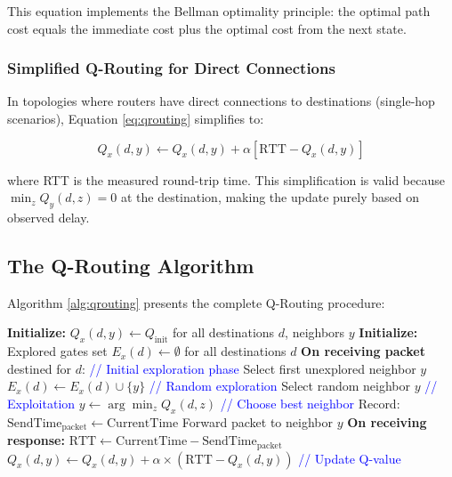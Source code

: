 \documentclass[12pt,a4paper]{article}
\begin{document}
This equation implements the Bellman optimality principle: the optimal path cost equals the immediate cost plus the optimal cost from the next state.

\subsubsection{Simplified Q-Routing for Direct Connections}

In topologies where routers have direct connections to destinations (single-hop scenarios), Equation \ref{eq:qrouting} simplifies to:

\begin{equation}
Q_x(d,y) \leftarrow Q_x(d,y) + \alpha \left[ \text{RTT} - Q_x(d,y) \right]
\label{eq:simple}
\end{equation}

where RTT is the measured round-trip time. This simplification is valid because $\min_{z} Q_y(d,z) = 0$ at the destination, making the update purely based on observed delay.

\subsection{The Q-Routing Algorithm}

Algorithm \ref{alg:qrouting} presents the complete Q-Routing procedure:

\begin{algorithm}
\caption{Q-Routing Protocol}
\label{alg:qrouting}
\begin{algorithmic}[1]
\STATE \textbf{Initialize:} $Q_x(d,y) \leftarrow Q_{\text{init}}$ for all destinations $d$, neighbors $y$
\STATE \textbf{Initialize:} Explored gates set $E_x(d) \leftarrow \emptyset$ for all destinations $d$
\STATE
{}
    \STATE \textbf{On receiving packet} destined for $d$:
    \STATE
     \textcolor{blue}{// Initial exploration phase}
        \STATE Select first unexplored neighbor $y$
        \STATE $E_x(d) \leftarrow E_x(d) \cup \{y\}$
     \textcolor{blue}{// Random exploration}
        \STATE Select random neighbor $y$
    \ELSE \textcolor{blue}{// Exploitation}
        \STATE $y \leftarrow \arg\min_{z} Q_x(d,z)$ \textcolor{blue}{// Choose best neighbor}
    \ENDIF
    \STATE
    \STATE Record: $\text{SendTime}_{\text{packet}} \leftarrow \text{CurrentTime}$
    \STATE Forward packet to neighbor $y$
    \STATE
    \STATE \textbf{On receiving response:}
    \STATE $\text{RTT} \leftarrow \text{CurrentTime} - \text{SendTime}_{\text{packet}}$
    \STATE $Q_x(d,y) \leftarrow Q_x(d,y) + \alpha \times (\text{RTT} - Q_x(d,y))$ \textcolor{blue}{// Update Q-value}
\ENDWHILE
\end{algorithmic}
\end{algorithm}
\end{document}

